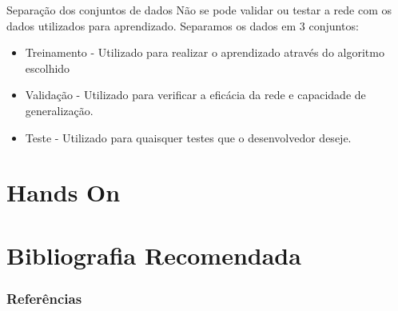 \documentclass{beamer}
\begin{document}
    \begin{frame}{Separação dos conjuntos de dados}
      Não se pode validar ou testar a rede com os dados utilizados para aprendizado. Separamos os dados em 3 conjuntos:
      \begin{itemize}
	\item Treinamento - Utilizado para realizar o aprendizado através do algoritmo escolhido
	\item Validação - Utilizado para verificar a eficácia da rede e capacidade de generalização.
	\item Teste  - Utilizado para quaisquer testes que o desenvolvedor deseje.
      \end{itemize}
    \end{frame}

  \section{Hands On}
    \frame{\sectionpage}
    
  \nocite{haykin, michell, isaias, faceli, ng, braga}
 
  \section{Bibliografia Recomendada}
  \begin{frame}[allowframebreaks]
    \frametitle{Referências}
    
    
  \end{frame}
\end{document}
